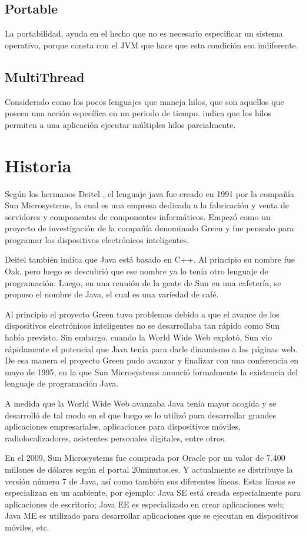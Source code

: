 \documentclass[12pt]{book} %
\begin{document}
\section{Portable}
La portabilidad, ayuda en el hecho que no es necesario especificar un sistema operativo, porque consta con el JVM que hace que esta condición sea indiferente.
\section{MultiThread}
Considerado como los pocos lenguajes que maneja hilos, que son aquellos que poseen una acción específica en un periodo de tiempo. \cite{thread} indica que los hilos permiten a una aplicación ejecutar múltiples hilos parcialmente.

\chapter{Historia}
Según los hermanos Deitel \cite{deitel}, el lenguaje java fue creado en 1991 por la compañía Sun Microsystems, la cual es una empresa dedicada a la fabricación y venta de servidores y componentes de componentes informáticos. Empezó como un proyecto de investigación de la compañía denominado Green y fue pensado para programar los dispositivos electrónicos inteligentes.

Deitel también indica que Java está basado en C++. Al principio su nombre fue Oak, pero luego se descubrió que ese nombre ya lo tenía otro lenguaje de programación. Luego, en una reunión de la gente de Sun en una cafetería, se propuso el nombre de Java, el cual es una variedad de café.

Al principio el proyecto Green tuvo problemas debido a que el avance de los dispositivos electrónicos inteligentes no se desarrollaba tan rápido como Sun había previsto. Sin embargo, cuando la World Wide Web explotó, Sun vio rápidamente el potencial que Java tenía para darle dinamismo a las páginas web. De esa manera el proyecto Green pudo avanzar y finalizar con una conferencia en mayo de 1995, en la que Sun Microsystems anunció formalmente la existencia del lenguaje de programación Java. 

A medida que la World Wide Web avanzaba Java tenía mayor acogida y se desarrolló de tal modo en el que luego se lo utilizó para desarrollar grandes aplicaciones empresariales, aplicaciones para dispositivos móviles, radiolocalizadores, asistentes personales digitales, entre otros. 

En el 2009, Sun Microsystems fue comprada por Oracle por un valor de 7.400 millones de dólares según el portal 20minutos.es\cite{20min}. Y actualmente se distribuye la versión número 7 de Java, así como también sus diferentes líneas. Estas líneas se especializan en un ambiente, por ejemplo: Java SE está creada especialmente para aplicaciones de escritorio; Java EE es especializado en crear aplicaciones web; Java ME es utilizado para desarrollar aplicaciones que se ejecutan en dispositivos móviles, etc.
\end{document}
